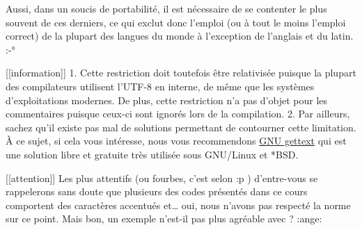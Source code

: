 \documentclass[]{article}
\begin{document}
Aussi, dans un soucis de portabilité, il est nécessaire de se contenter
le plus souvent de ces derniers, ce qui exclut donc l'emploi (ou à tout
le moins l'emploi correct) de la plupart des langues du monde à
l'exception de l'anglais et du latin. :-°

{[}{[}information{]}{]} \textbar{} 1. Cette restriction doit toutefois
être relativisée puisque la plupart des compilateurs utilisent l'UTF-8
en interne, de même que les systèmes d'exploitations modernes. De plus,
cette restriction n'a pas d'objet pour les commentaires puisque ceux-ci
sont ignorés lors de la compilation. \textbar{} 2. Par ailleurs, sachez
qu'il existe pas mal de solutions permettant de contourner cette
limitation. À ce sujet, si cela vous intéresse, nous vous recommendons
\href{https://www.gnu.org/software/gettext/manual/html_node/index.html}{GNU
gettext} qui est une solution libre et gratuite très utilisée sous
GNU/Linux et *BSD.

{[}{[}attention{]}{]} \textbar{} Les plus attentifs (ou fourbes, c'est
selon :p ) d'entre-vous se rappelerons sans doute que plusieurs des
codes présentés dans ce cours comportent des caractères accentués
et\ldots{} oui, nous n'avons pas respecté la norme sur ce point. Mais
bon, un exemple n'est-il pas plus agréable avec ? :ange:
\end{document}
